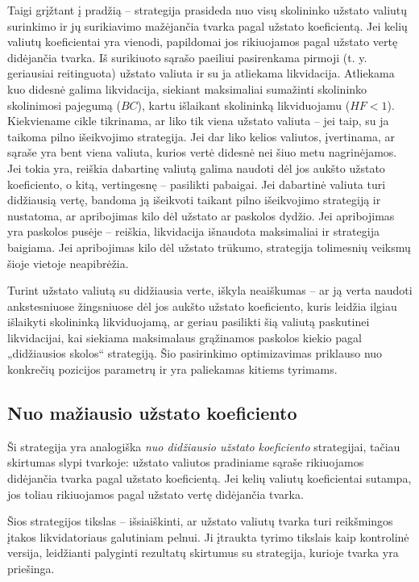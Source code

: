 \documentclass[]{VUMIFTemplateClass}
\begin{document}
Taigi grįžtant į pradžią – strategija prasideda nuo visų skolininko užstato valiutų surinkimo ir jų surikiavimo mažėjančia tvarka pagal užstato koeficientą. Jei kelių valiutų koeficientai yra vienodi, papildomai jos rikiuojamos pagal užstato vertę didėjančia tvarka. Iš surikiuoto sąrašo paeiliui pasirenkama pirmoji (t. y. geriausiai reitinguota) užstato valiuta ir su ja atliekama likvidacija. Atliekama kuo didesnė galima likvidacija, siekiant maksimaliai sumažinti skolininko skolinimosi pajegumą ($BC$), kartu išlaikant skolininką likviduojamu ($HF < 1$). Kiekviename cikle tikrinama, ar liko tik viena užstato valiuta – jei taip, su ja taikoma pilno išeikvojimo strategija. Jei dar liko kelios valiutos, įvertinama, ar sąraše yra bent viena valiuta, kurios vertė didesnė nei šiuo metu nagrinėjamos. Jei tokia yra, reiškia dabartinę valiutą galima naudoti dėl jos aukšto užstato koeficiento, o kitą, vertingesnę – pasilikti pabaigai. Jei dabartinė valiuta turi didžiausią vertę, bandoma ją išeikvoti taikant pilno išeikvojimo strategiją ir nustatoma, ar apribojimas kilo dėl užstato ar paskolos dydžio. Jei apribojimas yra paskolos pusėje – reiškia, likvidacija išnaudota maksimaliai ir strategija baigiama. Jei apribojimas kilo dėl užstato trūkumo, strategija tolimesnių veiksmų šioje vietoje neapibrėžia.

Turint užstato valiutą su didžiausia verte, iškyla neaiškumas – ar ją verta naudoti ankstesniuose žingsniuose dėl jos aukšto užstato koeficiento, kuris leidžia ilgiau išlaikyti skolininką likviduojamą, ar geriau pasilikti šią valiutą paskutinei likvidacijai, kai siekiama maksimalaus grąžinamos paskolos kiekio pagal „didžiausios skolos“ strategiją. Šio pasirinkimo optimizavimas priklauso nuo konkrečių pozicijos parametrų ir yra paliekamas kitiems tyrimams.

\subsection{Nuo mažiausio užstato koeficiento}

Ši strategija yra analogiška \textit{nuo didžiausio užstato koeficiento} strategijai, tačiau skirtumas slypi tvarkoje: užstato valiutos pradiniame sąraše rikiuojamos didėjančia tvarka pagal užstato koeficientą. Jei kelių valiutų koeficientai sutampa, jos toliau rikiuojamos pagal užstato vertę didėjančia tvarka.

Šios strategijos tikslas – išsiaiškinti, ar užstato valiutų tvarka turi reikšmingos įtakos likvidatoriaus galutiniam pelnui. Ji įtraukta tyrimo tikslais kaip kontrolinė versija, leidžianti palyginti rezultatų skirtumus su strategija, kurioje tvarka yra priešinga.
\end{document}
